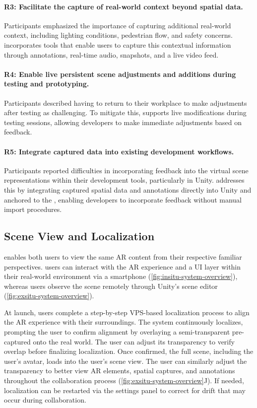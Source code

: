 \paragraph{\normalfont\textbf{R3: Facilitate the capture of real-world context beyond spatial data.}} Participants emphasized the importance of capturing additional real-world context, including lighting conditions, pedestrian flow, and safety concerns.
\SystemName incorporates tools that enable \insitu users to capture this contextual information through annotations, real-time audio, snapshots, and a live video feed.

\paragraph{\normalfont\textbf{R4: Enable live persistent scene adjustments and additions during testing and prototyping.}} Participants described having to return to their workplace to make adjustments after \insitu testing as challenging. To mitigate this, \SystemName supports live modifications during testing sessions, allowing developers to make immediate adjustments based on \insitu feedback.

\paragraph{\normalfont\textbf{R5: Integrate captured data into existing development workflows.}} Participants reported difficulties in incorporating \insitu feedback into the virtual scene representations within their development tools, particularly in Unity. \SystemName addresses this by integrating captured spatial data and annotations directly into Unity and anchored to the \locMesh, enabling developers to incorporate feedback without manual import procedures.

\subsection{Scene View and Localization}
\SystemName enables both users to view the same AR content from their respective familiar perspectives. \Insitu users can interact with the AR experience and a \SystemName UI layer within their real-world environment via a smartphone (\cref{fig:insitu-system-overview}), whereas \exsitu users observe the scene remotely through Unity's scene editor (\cref{fig:exsitu-system-overview}).

At launch, \insitu users complete a step-by-step VPS-based localization process to align the AR experience with their surroundings. The system continuously localizes, prompting the \insitu user to confirm alignment by overlaying a semi-transparent pre-captured \locMesh onto the real world. The \insitu user can adjust its transparency to verify overlap before finalizing localization. Once confirmed, the full scene, including the \insitu user's avatar, loads into the \exsitu user's scene view. The \exsitu user can similarly adjust the \locMesh transparency to better view AR elements, spatial captures, and annotations throughout the collaboration process (\cref{fig:exsitu-system-overview}J). If needed, localization can be restarted via the settings panel to correct for drift that may occur during collaboration.


